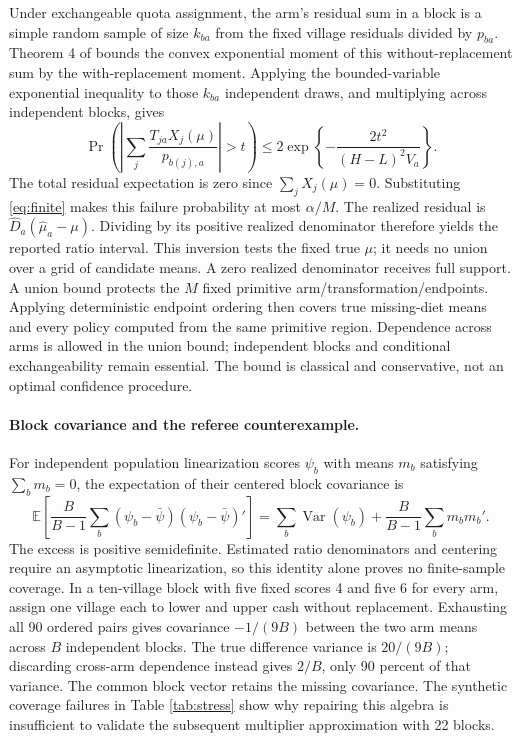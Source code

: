 \documentclass[11pt]{article}
\newcommand{\E}{\mathbb{E}}
\begin{document}
Under exchangeable quota assignment, the arm's residual sum in a block is a simple random sample of size $k_{ba}$ from the fixed village residuals divided by $p_{ba}$. Theorem 4 of \citet{hoeffding1963} bounds the convex exponential moment of this without-replacement sum by the with-replacement moment. Applying the bounded-variable exponential inequality to those $k_{ba}$ independent draws, and multiplying across independent blocks, gives
\[
 \Pr\!\left(\left|\sum_j\frac{T_{ja}X_j(\mu)}{p_{b(j),a}}\right|>t\right)
 \leq 2\exp\left\{-\frac{2t^2}{(H-L)^2V_a}\right\}.
\]
The total residual expectation is zero since $\sum_jX_j(\mu)=0$. Substituting \eqref{eq:finite} makes this failure probability at most $\alpha/M$. The realized residual is $\widehat D_a(\widehat\mu_a-\mu)$. Dividing by its positive realized denominator therefore yields the reported ratio interval. This inversion tests the fixed true $\mu$; it needs no union over a grid of candidate means. A zero realized denominator receives full support. A union bound protects the $M$ fixed primitive arm/transformation/endpoints. Applying deterministic endpoint ordering then covers true missing-diet means and every policy computed from the same primitive region. Dependence across arms is allowed in the union bound; independent blocks and conditional exchangeability remain essential. The bound is classical and conservative, not an optimal confidence procedure.

\paragraph{Block covariance and the referee counterexample.}
For independent population linearization scores $\psi_b$ with means $m_b$ satisfying $\sum_bm_b=0$, the expectation of their centered block covariance is
\[
 \E\left[\frac{B}{B-1}\sum_b(\psi_b-\bar\psi)(\psi_b-\bar\psi)'\right]
 =\sum_b\operatorname{Var}(\psi_b)+\frac{B}{B-1}\sum_bm_bm_b'.
\]
The excess is positive semidefinite. Estimated ratio denominators and centering require an asymptotic linearization, so this identity alone proves no finite-sample coverage. In a ten-village block with five fixed scores 4 and five 6 for every arm, assign one village each to lower and upper cash without replacement. Exhausting all 90 ordered pairs gives covariance $-1/(9B)$ between the two arm means across $B$ independent blocks. The true difference variance is $20/(9B)$; discarding cross-arm dependence instead gives $2/B$, only 90 percent of that variance. The common block vector retains the missing covariance. The synthetic coverage failures in Table \ref{tab:stress} show why repairing this algebra is insufficient to validate the subsequent multiplier approximation with 22 blocks.
\end{document}
